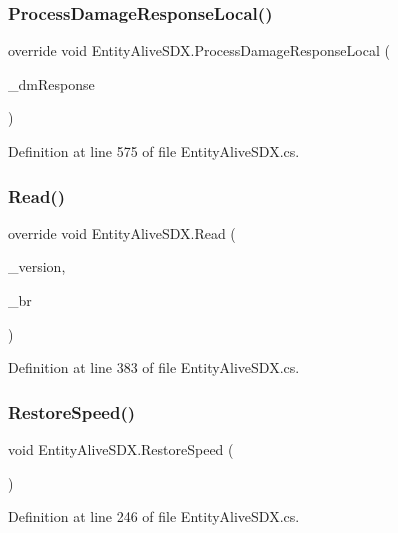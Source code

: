 \subsubsection{\texorpdfstring{ProcessDamageResponseLocal()}{ProcessDamageResponseLocal()}}
{\footnotesize\ttfamily override void Entity\+Alive\+S\+D\+X.\+Process\+Damage\+Response\+Local (\begin{DoxyParamCaption}\item[{Damage\+Response}]{\+\_\+dm\+Response }\end{DoxyParamCaption})}



Definition at line 575 of file Entity\+Alive\+S\+D\+X.\+cs.

\mbox{\label{class_entity_alive_s_d_x_a8ce4e466096f23ab428ab17bd68f2dbf}} 
\subsubsection{\texorpdfstring{Read()}{Read()}}
{\footnotesize\ttfamily override void Entity\+Alive\+S\+D\+X.\+Read (\begin{DoxyParamCaption}\item[{byte}]{\+\_\+version,  }\item[{Binary\+Reader}]{\+\_\+br }\end{DoxyParamCaption})}



Definition at line 383 of file Entity\+Alive\+S\+D\+X.\+cs.

\mbox{\label{class_entity_alive_s_d_x_a811e2987752f0e9dbdf8a346f34fabaf}} 
\subsubsection{\texorpdfstring{RestoreSpeed()}{RestoreSpeed()}}
{\footnotesize\ttfamily void Entity\+Alive\+S\+D\+X.\+Restore\+Speed (\begin{DoxyParamCaption}{ }\end{DoxyParamCaption})}



Definition at line 246 of file Entity\+Alive\+S\+D\+X.\+cs.

